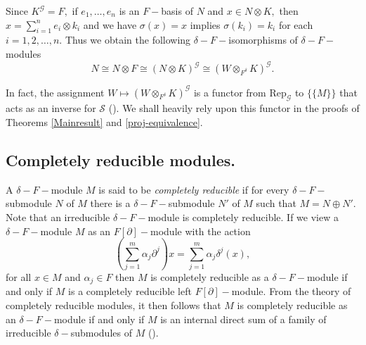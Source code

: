 \documentclass[preprint, 11pt]{amsart}
\theoremstyle{corollary}
\theoremstyle{remark}
\theoremstyle{proposition}
\numberwithin{equation}{subsection}
\begin{document}
 Since $K^{\mathscr G}=F,$ if $e_1,\dots, e_n$ is an $F-$basis of $N$ and $x\in N\otimes K,$ then $x=\sum^n_{i=1}e_i\otimes k_i$ and we have $\sigma(x)=x$ implies $\sigma(k_i)=k_i$ for each $i=1,2,\dots, n.$ Thus we obtain the following $\delta-F-$isomorphisms of $\delta-F-$modules \begin{equation*}\label{recovering module}N\cong N\otimes F\cong (N\otimes K)^\mathscr{G}\cong \left(W\otimes_{F^{\delta}} K\right)^\mathscr G.\end{equation*}

In fact, the assignment  $W\mapsto \left(W\otimes_{F^{\delta}} K\right)^\mathscr G$ is a functor from $\mathrm{Rep}_\mathscr{G}$ to $\{\{M\}\}$ that acts as an inverse for $\mathscr S$ (\cite[Remark 2.34]{MvdP03}).  We shall heavily rely upon this functor in the proofs of Theorems \ref{Mainresult} and \ref{proj-equivalence}.




\subsection{Completely reducible modules.} A $\delta-F-$module  $M$ is said to be \emph{completely reducible} if for every $\delta-F-$submodule $N$ of $M$ there is a $\delta-F-$submodule $N'$ of $M$ such that $M=N\oplus N'$. Note that an irreducible $\delta-F-$module is completely reducible. If we view a $ \delta-F-$module $M$ as an $F[\partial]-$module with the action $$\left(\sum^m_{j=1}\alpha_j\partial^j\right) x=\sum^m_{j=1}\alpha_j\delta^j(x),$$ for all $x\in M$ and $\alpha_j\in F$ then $M$ is  completely reducible as a $\delta-F-$module if and only if  $M$ is a completely reducible left $F[\partial]-$module. From the theory of completely reducible modules, it then follows that $M$ is  completely reducible as an $ \delta-F-$module  if and only if $M$  is an internal direct sum of a family of irreducible $\delta-$submodules of $M$ (\cite[Section 3.5, p.119]{Jac-80-book}). 
\end{document}
